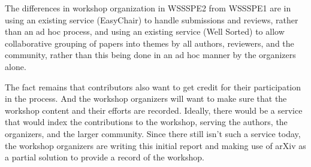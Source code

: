 \documentclass[11pt, oneside]{amsart}
\begin{document}
The differences in workshop organization in WSSSPE2 from WSSSPE1
are in using an existing service (EasyChair) to handle submissions and reviews,
rather than an ad hoc process, and using an existing service (Well Sorted) to
allow collaborative grouping of papers into themes by all authors, reviewers,
and the community, rather than this being done in an ad hoc manner by the
organizers alone.

The fact remains that contributors also want to get credit for their
participation in the process. And the workshop organizers will want to make
sure that the workshop content and their efforts are recorded. Ideally, there
would be a service that would index the contributions to the
workshop, serving the authors, the organizers, and the larger community. 
Since there still isn't such a service today, the workshop organizers are
writing this initial report and making use of arXiv as a partial solution to
provide a record of the workshop.
\end{document}

